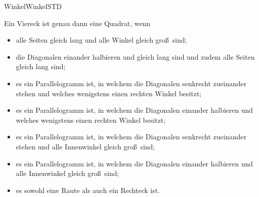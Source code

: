 \begin{MXContent}{Winkel}{Winkel}{STD}
\begin{MInfo}%
Ein Viereck ist genau dann eine Quadrat, wenn
\begin{itemize}
\item alle Seiten gleich lang und alle Winkel gleich gro\ss\ sind;
 \item die Diagonalen einander halbieren und gleich lang sind und zudem alle Seiten gleich lang sind;
 \item es ein Parallelogramm ist, in welchem die Diagonalen senkrecht zueinander stehen und welches wenigstens einen rechten Winkel besitzt;
 \item es ein Parallelogramm ist, in welchem die Diagonalen einander halbieren und welches wenigstens einen rechten Winkel besitzt;
 \item es ein Parallelogramm ist, in welchem die Diagonalen senkrecht zueinander stehen und alle Innenwinkel gleich gro\ss\ sind;
 \item es ein Parallelogramm ist, in welchem die Diagonalen einander halbieren und alle Innenwinkel gleich gro\ss\ sind;
\item es sowohl eine Raute als auch ein Rechteck ist.
\end{itemize}
\end{MInfo}

\end{MXContent}



